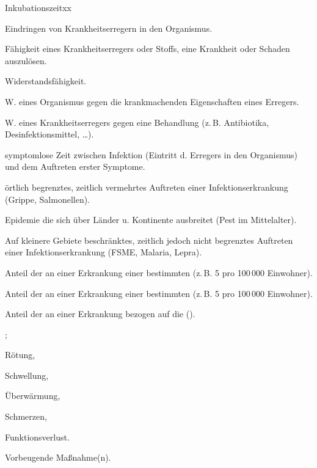 \begin{labeling}[~--]{Inkubationszeitxx}
  \item[\T{Infektion}]
  Eindringen von Krankheitserregern in den Organismus.
  \item[\T{Pathogenität}] 
  Fähigkeit eines Krankheitserregers oder Stoffs, eine
  Krankheit oder Schaden auszulösen.
  \item[\T{Resistenz}]
  \begin{inparadesc}
    \item[Allg.:] Widerstandsfähigkeit.
    \item[Spez.:]
    \begin{inparaenum}
      \item W. eines Organismus gegen die
      krankmachenden Eigenschaften eines Erregers.
      \item W. eines Krankheitserregers gegen eine Behandlung (z.\,B.
      Antibiotika, Desinfektionsmittel, \ldots{}).
    \end{inparaenum}
  \end{inparadesc}
  \item[\T{Inkubationszeit}]
  symptomlose Zeit zwischen Infektion (Eintritt d.
  Erregers in den Organismus) und dem Auftreten erster Symptome.
  \item[\T{Epidemie}]
  örtlich begrenztes, zeitlich vermehrtes Auftreten einer  Infektionserkrankung
  (Grippe, Salmonellen).
  \item[\T{Pandemie}]
  Epidemie die sich über Länder u. Kontinente ausbreitet (Pest im Mittelalter).
  \item[\T{Endemie}]
  Auf kleinere Gebiete beschränktes, zeitlich jedoch nicht begrenztes
  Auftreten einer Infektionserkrankung  (FSME, Malaria, Lepra).
  \item[\T{Morbidität}]
  Anteil der an einer Erkrankung  einer bestimmten
   (z.\,B. 5 pro 100\,000 Einwohner).
  \item[\T{Mortalität}]
  Anteil der an einer Erkrankung  einer bestimmten 
  (z.\,B. 5 pro 100\,000 Einwohner).
  \item[\T{Letalität}]
  Anteil der  an einer Erkrankung  bezogen auf die  ().
  \item[\T{Entzündung}] ;
  \begin{inparaenum}
    \item Rötung,
    \item Schwellung,
    \item Überwärmung,
    \item Schmerzen,
    \item Funktionsverlust.
  \end{inparaenum}
  \item[\T{Prophylaxe}] 
  Vorbeugende Maßnahme(n).
\end{labeling}

